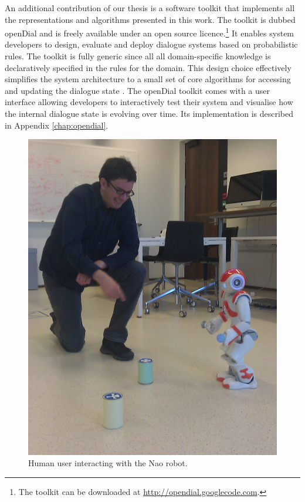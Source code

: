 An additional contribution of our thesis is a software toolkit that implements all the representations and algorithms presented in this work. The toolkit is dubbed \textsf{openDial} and is freely available under an open source licence.\footnote{The toolkit can be downloaded at \url{http://opendial.googlecode.com}.} It enables system developers to design, evaluate and deploy dialogue systems based on probabilistic rules. 
The toolkit is fully generic since all all domain-specific knowledge is declaratively specified in the rules for the domain.  This design choice effectively simplifies the system architecture to a small set of core algorithms for accessing and updating the dialogue state \citep{lison-semdial2012}. The \textsf{openDial} toolkit comes with a user interface allowing developers to interactively test their system and visualise how the internal dialogue state is evolving over time.  Its implementation is described in Appendix \ref{chap:opendial}. 

\begin{figure}
\vspace{-6mm}
\begin{center}
\includegraphics[scale=0.10]{imgs/nao1.jpg}
\end{center} 
\caption{Human user interacting with the Nao robot.}
\label{fig:nao}
\end{figure}

